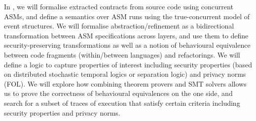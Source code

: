 \begin{Workpackage}{\thewpno}
\begin{Task}
\TaskResults{%
\ref{del:formal1},
\ref{del:formal2},
\ref{del:formal3}
}
\TaskHeader{}

In \theTask, we will formalise extracted contracts from source code using concurrent ASMs, and define a semantics over ASM runs using the true-concurrent model of event structures. 
We will formalise abstraction/refinement as a bidirectional transformation between ASM specifications across layers, and use them to define 
security-preserving transformations as well as a notion of behavioural equivalence between code fragments (within/between languages) and refactorings.
We will define a logic to capture properties of interest  including security properties (based on distributed stochastic temporal logics or separation
logic) and privacy norms (FOL).
We will explore how combining theorem provers and SMT solvers allows us to prove the correctness of behavioural equivalences on the one side, and search for a subset of traces of execution that satisfy certain criteria including security properties and privacy norms.
\end{Task}


\end{Workpackage}
